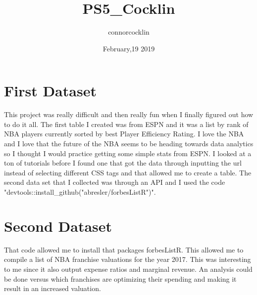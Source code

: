\documentclass{article}
\title{PS5_Cocklin}
\author{connorcocklin }
\date{February,19 2019}
\begin{document}
\maketitle

\section{First Dataset}
This project was really difficult and then really fun when I finally figured out how to do it all. The first table I created was from ESPN and it was a list by rank of NBA players currently sorted by best Player Efficiency Rating. I love the NBA and I love that the future of the NBA seems to be heading towards data analytics so I thought I would practice getting some simple stats from ESPN. I looked at a ton of tutorials before I found one that got the data through inputting the url instead of selecting different CSS tags and that allowed me to create a table. The second data set that I collected was through an API and I used the code "devtools::install_github("abresler/forbesListR")".
\section{Second Dataset}
That code allowed me to install that packages forbesListR. This allowed me to compile a list of NBA franchise valuations for the year 2017. This was interesting to me since it also output expense ratios and marginal revenue. An analysis could be done versus which franchises are optimizing their spending and making it result in an increased valuation. 
\end{document}

